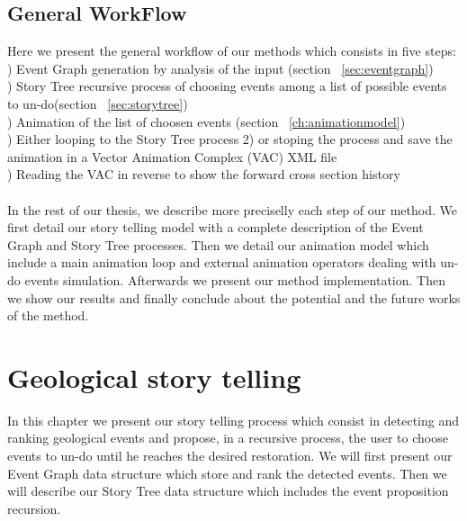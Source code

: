 \documentclass[12pt, a4paper]{report} %
\begin{document}
\section{General WorkFlow}

Here we present the general workflow  of our methods which consists in five steps:\\

) Event Graph generation by analysis of the input (section ~\ref{sec:eventgraph})\\
) Story Tree recursive process of choosing events among a list of possible events to un-do(section ~\ref{sec:storytree})\\
) Animation of the list of choosen events (section ~\ref{ch:animationmodel})\\
) Either looping to the Story Tree process 2) or stoping the process and save the animation in a Vector Animation Complex (VAC) XML file\cite{vac} \\
) Reading the VAC in reverse to show the forward cross section history
\\\\
In the rest of our thesis, we describe more preciselly each step of our method. We first detail our story telling model with a complete description of the Event Graph and Story Tree processes. Then we detail our animation model  which include a main animation loop and external animation operators dealing with un-do events simulation. Afterwards we present our method implementation. Then we show our results and finally conclude about the potential and the future works of the method. 

\chapter{Geological story telling}

In this chapter we present our story telling process which consist in detecting and ranking geological events and propose, in a recursive process, the user to choose events to un-do until he reaches the desired restoration.
We will first present our Event Graph data structure which store and rank the detected events. Then we will describe our Story Tree data structure which includes the event proposition recursion.
\end{document}
